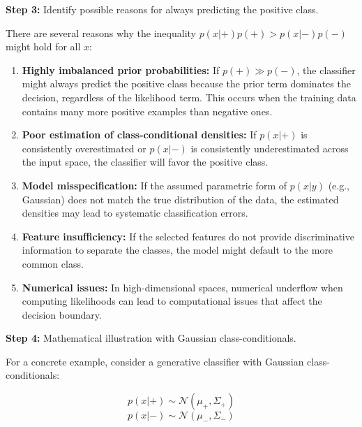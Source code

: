 \documentclass{article}
\begin{document}
\parbox{\textwidth}{\textbf{Step 3:} Identify possible reasons for always predicting the positive class.}

\vspace{0.2cm}

\parbox{\textwidth}{There are several reasons why the inequality $p(x|+)p(+) > p(x|-)p(-)$ might hold for all $x$:}

\begin{enumerate}
    \item \textbf{Highly imbalanced prior probabilities:} If $p(+) \gg p(-)$, the classifier might always predict the positive class because the prior term dominates the decision, regardless of the likelihood term. This occurs when the training data contains many more positive examples than negative ones.
    
    \item \textbf{Poor estimation of class-conditional densities:} If $p(x|+)$ is consistently overestimated or $p(x|-)$ is consistently underestimated across the input space, the classifier will favor the positive class.
    
    \item \textbf{Model misspecification:} If the assumed parametric form of $p(x|y)$ (e.g., Gaussian) does not match the true distribution of the data, the estimated densities may lead to systematic classification errors.
    
    \item \textbf{Feature insufficiency:} If the selected features do not provide discriminative information to separate the classes, the model might default to the more common class.
    
    \item \textbf{Numerical issues:} In high-dimensional spaces, numerical underflow when computing likelihoods can lead to computational issues that affect the decision boundary.
\end{enumerate}

\vspace{0.3cm}

\parbox{\textwidth}{\textbf{Step 4:} Mathematical illustration with Gaussian class-conditionals.}

\vspace{0.2cm}

\parbox{\textwidth}{For a concrete example, consider a generative classifier with Gaussian class-conditionals:}

$$p(x|+) \sim \mathcal{N}(\mu_+, \Sigma_+)$$
$$p(x|-) \sim \mathcal{N}(\mu_-, \Sigma_-)$$
\end{document}
